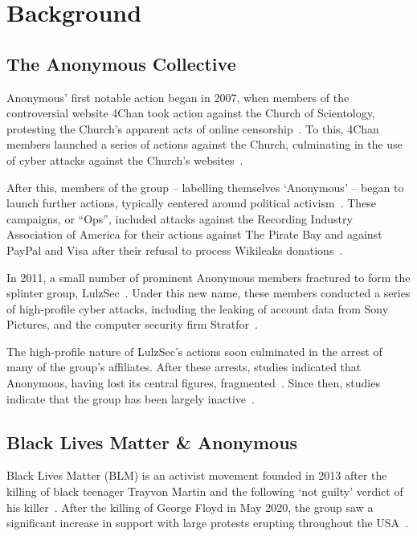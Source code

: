 \documentclass[letterpaper]{article}
\begin{document}
\section{Background}
\label{Background}

\subsection{The Anonymous Collective}

Anonymous' first notable action began in 2007, when members of the controversial website 4Chan took action against the Church of Scientology, protesting the Church's apparent acts of online censorship~\cite{Olson2013}. To this, 4Chan members launched a series of actions against the Church, culminating in the use of cyber attacks against the Church's websites~\cite{Olson2013}.

After this, members of the group -- labelling themselves `Anonymous' -- began to launch further actions, typically centered around political activism~\cite{Olson2013}. These campaigns, or ``Ops'', included attacks against the Recording Industry Association of America for their actions against The Pirate Bay and against PayPal and Visa after their refusal to process Wikileaks donations~\cite{Uitermark2017}.

In 2011, a small number of prominent Anonymous members fractured to form the splinter group, LulzSec~\cite{Jones2020}. Under this new name, these members conducted a series of high-profile cyber attacks, including the leaking of account data from Sony Pictures, and the computer security firm Stratfor~\cite{Olson2013}.

The high-profile nature of LulzSec's actions soon culminated in the arrest of many of the group's affiliates. After these arrests, studies indicated that Anonymous, having lost its central figures, fragmented~\cite{Olson2013}. Since then, studies indicate that the group has been largely inactive~\cite{Jones2020,Uitermark2017}. 

\subsection{Black Lives Matter \& Anonymous} 

Black Lives Matter (BLM) is an activist movement founded in 2013 after the killing of black teenager Trayvon Martin and the following `not guilty' verdict of his killer~\cite{Carney2016}. After the killing of George Floyd in May 2020, the group saw a significant increase in support with large protests erupting throughout the USA~\cite{NYT2020}.
\end{document}
